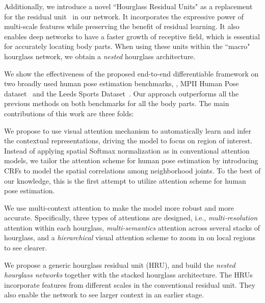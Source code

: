 \documentclass[10pt,twocolumn,letterpaper]{article}
\newenvironment{myitemize}[1][]{
\begin{list}{{#1}} {
	\setlength{\leftmargin}{1.1em}
	\setlength{\topsep}{0em}
	\setlength{\itemsep}{-0.5em}
}}
{\end{list}}
\begin{document}
Additionally, we introduce a novel ``Hourglass Residual Units" as a replacement for the residual unit~\cite{he2016deep} in our network.
It incorporates the expressive power of multi-scale features while preserving the benefit of residual learning. 
It also enables deep networks to have a faster growth of receptive field, which is essential for accurately locating body parts. 
When using these units within the ``macro" hourglass network, we obtain a \textit{nested} hourglass architecture. 




We show the effectiveness of the proposed end-to-end differentiable framework on two broadly used human pose estimation benchmarks, \ie, MPII Human Pose dataset~\cite{andriluka20142d} and the Leeds Sports Dataset~\cite{johnson2010clustered}. Our approach outperforms all the previous methods on both benchmarks for all the body parts.
The main contributions of this work are three folds:
\begin{myitemize}
\item[] 
We propose to use visual attention mechanism to automatically learn and infer the contextual representations, driving the model to focus on region of interest.
Instead of applying spatial Softmax normalization as in conventional attention models, we tailor the attention scheme for human pose estimation by introducing CRFs to model the spatial correlations among neighborhood joints.
To the best of our knowledge, this is the first attempt to utilize attention scheme for human pose estimation.


\item[] 
We use multi-context attention to make the model more robust and more accurate. Specifically, three types of attentions are designed, i.e., \textit{multi-resolution} attention within each hourglass, \textit{multi-semantics} attention across several stacks of hourglass, and a \textit{hierarchical} visual attention scheme to zoom in on local regions to see clearer.

\item[] 
We propose a generic hourglass residual unit (HRU), and build the \textit{nested hourglass networks} together with the stacked hourglass architecture. The HRUs incorporate features from different scales in the conventional residual unit. They also enable the network to see larger context in an earlier stage.
 

\end{myitemize}
\end{document}
